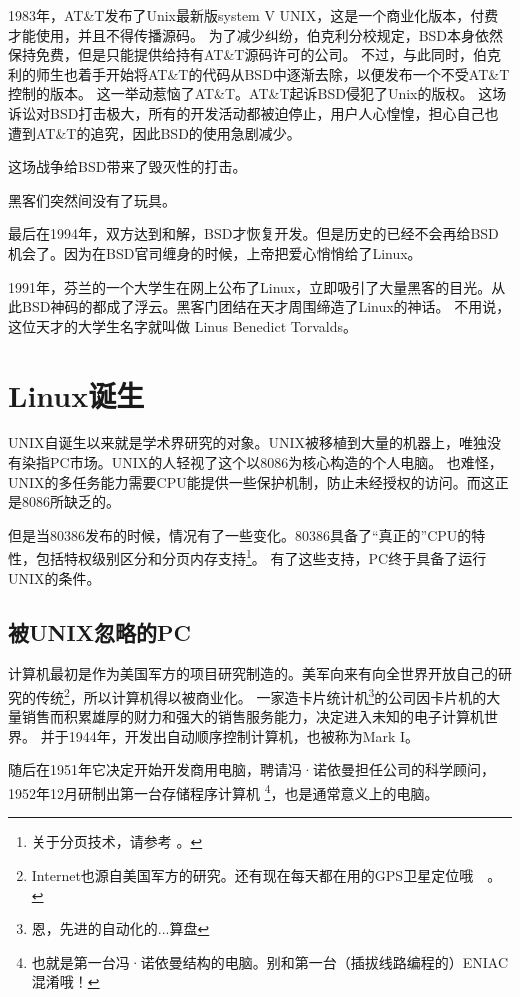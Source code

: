 1983年，AT\&T发布了Unix最新版system V UNIX，这是一个商业化版本，付费才能使用，并且不得传播源码。
为了减少纠纷，伯克利分校规定，BSD本身依然保持免费，但是只能提供给持有AT\&T源码许可的公司。
不过，与此同时，伯克利的师生也着手开始将AT\&T的代码从BSD中逐渐去除，以便发布一个不受AT\&T控制的版本。
这一举动惹恼了AT\&T。AT\&T起诉BSD侵犯了Unix的版权。
这场诉讼对BSD打击极大，所有的开发活动都被迫停止，用户人心惶惶，担心自己也遭到AT\&T的追究，因此BSD的使用急剧减少。

这场战争给BSD带来了毁灭性的打击。


黑客们突然间没有了玩具。

最后在1994年，双方达到和解，BSD才恢复开发。但是历史的已经不会再给BSD机会了。因为在BSD官司缠身的时候，上帝把爱心悄悄给了Linux。

1991年，芬兰的一个大学生在网上公布了Linux，立即吸引了大量黑客的目光。从此BSD神码的都成了浮云。黑客门团结在天才周围缔造了Linux的神话。
不用说，这位天才的大学生名字就叫做 Linus Benedict Torvalds。

\section{Linux诞生}

UNIX自诞生以来就是学术界研究的对象。UNIX被移植到大量的机器上，唯独没有染指PC市场。UNIX的人轻视了这个以8086为核心构造的个人电脑。
也难怪，UNIX的多任务能力需要CPU能提供一些保护机制，防止未经授权的访问。而这正是8086所缺乏的。

但是当80386发布的时候，情况有了一些变化。80386具备了“真正的”CPU的特性，包括特权级别区分和分页内存支持\footnote{关于分页技术，请参考 。}。 有了这些支持，PC终于具备了运行UNIX的条件。

\subsection{被UNIX忽略的PC}
计算机最初是作为美国军方的项目研究制造的。美军向来有向全世界开放自己的研究的传统\footnote{Internet也源自美国军方的研究。还有现在每天都在用的GPS卫星定位哦~~。}，所以计算机得以被商业化。
一家造卡片统计机\footnote{恩，先进的自动化的...算盘}的公司因卡片机的大量销售而积累雄厚的财力和强大的销售服务能力，决定进入未知的电子计算机世界。
并于1944年，开发出自动顺序控制计算机，也被称为Mark  I。


随后在1951年它决定开始开发商用电脑，聘请冯·诺依曼担任公司的科学顾问，1952年12月研制出第一台存储程序计算机
\footnote{也就是第一台冯·诺依曼结构的电脑。别和第一台（插拔线路编程的）ENIAC混淆哦！}，也是通常意义上的电脑。

